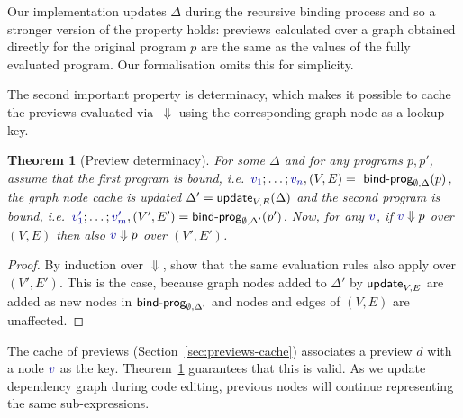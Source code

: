 \documentclass[english,submission]{programming}
\newcounter{thc}
\theoremstyle{plain}
\newtheorem{theorem}[thc]{Theorem}
\theoremstyle{definition}
\newcommand{\ident}[1]{\textnormal{\textcolor{idclr}{\sffamily #1}}}
\newcommand{\bndclr}[1]{\textcolor{kvdclr}{#1}}
\begin{document}
\noindent
Our implementation updates $\Delta$ during the recursive binding process and so a stronger version
of the property holds: previews calculated over a graph obtained directly for the original program
$p$ are the same as the values of the fully evaluated program. Our formalisation omits this for
simplicity.

The second important property is determinacy, which makes it possible to cache the previews
evaluated via~$\Downarrow$ using the corresponding graph node as a lookup key.

\begin{theorem}[Preview determinacy]
\label{thm:determinacy}
For some $\Delta$ and for any programs $p, p'$, assume that the first program is bound,
i.e.~$\bndclr{v_1};\ldots;\bndclr{v_n}, (V, E) = \ident{bind-prog}_{\emptyset, \Delta}(p)$,
the graph node cache is updated $\Delta' = \ident{update}_{V, E}(\Delta)$ and the second program is
bound, i.e.~$\bndclr{v'_1};\ldots;\bndclr{v'_m}, (V', E') = \ident{bind-prog}_{\emptyset, \Delta'}(p')$.
Now, for any $\bndclr{v}$, if $\bndclr{v} \Downarrow p$ over $(V, E)$ then also
 $\bndclr{v} \Downarrow p$ over $(V', E')$.
\end{theorem}
\begin{proof}
By induction over $\Downarrow$, show that the same evaluation rules also
apply over $(V', E')$. This is the case, because graph nodes added to $\Delta'$ by $\ident{update}_{V, E}$
are added as new nodes in $\ident{bind-prog}_{\emptyset, \Delta'}$ and
nodes and edges of $(V, E)$ are unaffected.
\end{proof}

\noindent
The cache of previews (Section~\ref{sec:previews-cache}) associates a preview $d$ with a node
$\bndclr{v}$ as the key. Theorem~\ref{thm:determinacy} guarantees that this is valid. As we update dependency
graph during code editing, previous nodes will continue representing the same sub-expressions.


\end{document}
